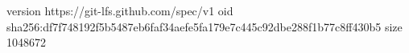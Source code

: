 version https://git-lfs.github.com/spec/v1
oid sha256:df7f748192f5b5487eb6faf34aefe5fa179e7c445c92dbe288f1b77c8ff430b5
size 1048672
